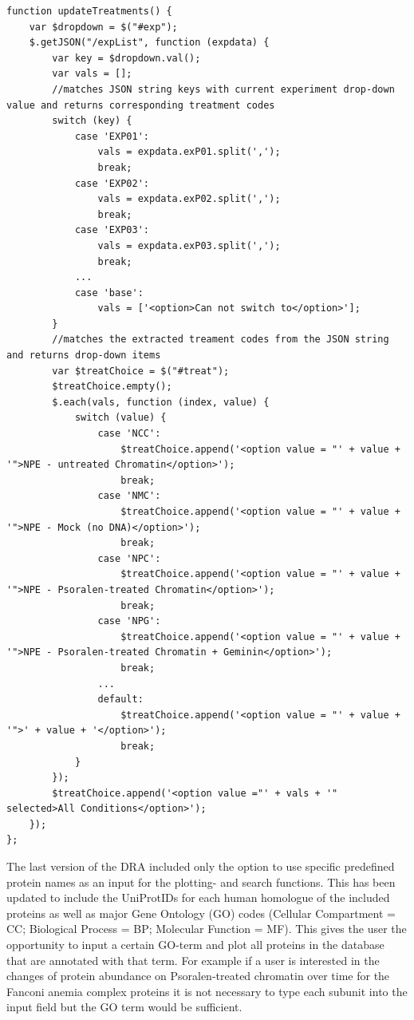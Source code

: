 \begin{lstlisting}
function updateTreatments() {
    var $dropdown = $("#exp");
    $.getJSON("/expList", function (expdata) {
        var key = $dropdown.val();
        var vals = [];
        //matches JSON string keys with current experiment drop-down value and returns corresponding treatment codes
        switch (key) {
            case 'EXP01':
                vals = expdata.exP01.split(',');
                break;
            case 'EXP02':
                vals = expdata.exP02.split(',');
                break;
            case 'EXP03':
                vals = expdata.exP03.split(',');
                break;
            ...
            case 'base':
                vals = ['<option>Can not switch to</option>'];
        }
        //matches the extracted treament codes from the JSON string and returns drop-down items
        var $treatChoice = $("#treat");
        $treatChoice.empty();
        $.each(vals, function (index, value) {
            switch (value) {
                case 'NCC':
                    $treatChoice.append('<option value = "' + value + '">NPE - untreated Chromatin</option>');
                    break;
                case 'NMC':
                    $treatChoice.append('<option value = "' + value + '">NPE - Mock (no DNA)</option>');
                    break;
                case 'NPC':
                    $treatChoice.append('<option value = "' + value + '">NPE - Psoralen-treated Chromatin</option>');
                    break;
                case 'NPG':
                    $treatChoice.append('<option value = "' + value + '">NPE - Psoralen-treated Chromatin + Geminin</option>');
                    break;
                ...
                default:
                    $treatChoice.append('<option value = "' + value + '">' + value + '</option>');
                    break;
            }
        });
        $treatChoice.append('<option value ="' + vals + '" selected>All Conditions</option>');
    });
}; 
\end{lstlisting}
The last version of the DRA included only the option to use specific predefined protein names as an input for the plotting- and search functions. This has been updated to include the UniProtIDs for each human homologue of the included proteins as well as major Gene Ontology (GO) codes (Cellular Compartment = CC; Biological Process = BP; Molecular Function = MF). This gives the user the opportunity to input a certain GO-term and plot all proteins in the database that are annotated with that term. For example if a user is interested in the changes of protein abundance on Psoralen-treated chromatin over time for the Fanconi anemia complex proteins it is not necessary to type each subunit into the input field but the GO term would be sufficient.
